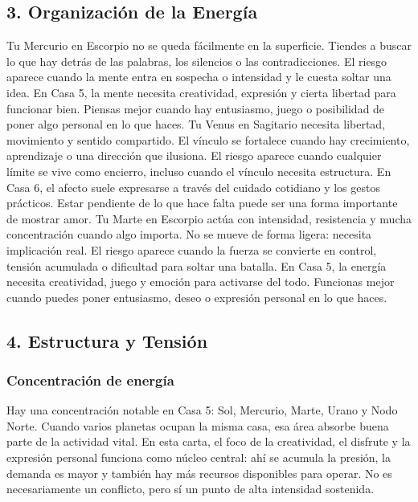 \documentclass[11pt,a4paper]{article}\usepackage[utf8]{inputenc}
\begin{document}
\vspace{0.8cm}

\subsection{3. Organización de la Energía}

Tu Mercurio en Escorpio no se queda fácilmente en la superficie. Tiendes a buscar lo que hay detrás de las palabras, los silencios o las contradicciones. El riesgo aparece cuando la mente entra en sospecha o intensidad y le cuesta soltar una idea. En Casa 5, la mente necesita creatividad, expresión y cierta libertad para funcionar bien. Piensas mejor cuando hay entusiasmo, juego o posibilidad de poner algo personal en lo que haces. Tu Venus en Sagitario necesita libertad, movimiento y sentido compartido. El vínculo se fortalece cuando hay crecimiento, aprendizaje o una dirección que ilusiona. El riesgo aparece cuando cualquier límite se vive como encierro, incluso cuando el vínculo necesita estructura. En Casa 6, el afecto suele expresarse a través del cuidado cotidiano y los gestos prácticos. Estar pendiente de lo que hace falta puede ser una forma importante de mostrar amor. Tu Marte en Escorpio actúa con intensidad, resistencia y mucha concentración cuando algo importa. No se mueve de forma ligera: necesita implicación real. El riesgo aparece cuando la fuerza se convierte en control, tensión acumulada o dificultad para soltar una batalla. En Casa 5, la energía necesita creatividad, juego y emoción para activarse del todo. Funcionas mejor cuando puedes poner entusiasmo, deseo o expresión personal en lo que haces.

\vspace{0.8cm}

\subsection{4. Estructura y Tensión}

\subsubsection*{Concentración de energía}

Hay una concentración notable en Casa 5: Sol, Mercurio, Marte, Urano y Nodo Norte. Cuando varios planetas ocupan la misma casa, esa área absorbe buena parte de la actividad vital. En esta carta, el foco de la creatividad, el disfrute y la expresión personal funciona como núcleo central: ahí se acumula la presión, la demanda es mayor y también hay más recursos disponibles para operar. No es necesariamente un conflicto, pero sí un punto de alta intensidad sostenida.
\end{document}
